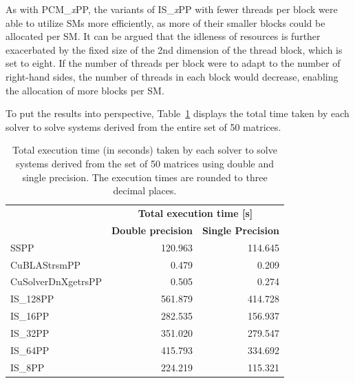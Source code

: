 As with PCM\_\textit{x}PP, the variants of IS\_\textit{x}PP with fewer threads per block were able to utilize SMs more efficiently, as more of their smaller blocks could be allocated per SM.
It can be argued that the idleness of resources is further exacerbated by the fixed size of the 2nd dimension of the thread block, which is set to eight.
If the number of threads per block were to adapt to the number of right-hand sides, the number of threads in each block would decrease, enabling the allocation of more blocks per SM.

To put the results into perspective, Table~\ref{Table:comparing-decomposers-and-solvers->decomposition-project-benchmarks->solvers-benchmark->comparison-of-execution-times-on-all-matrices->total-execution-time-of-solvers-on-set-of-50-matrices} displays the total time taken by each solver to solve systems derived from the entire set of 50 matrices.

\begin{table}[ht!]
	\centering
	\begin{tabular}{|l|r|r|}
		\hline
		\rowcolor[HTML]{C0C0C0} 
		\multicolumn{1}{|c|}{\cellcolor[HTML]{C0C0C0}}                                      & \multicolumn{2}{c|}{\cellcolor[HTML]{C0C0C0}\textbf{Total execution time {[}s{]}}}                                                                        \\ \cline{2-3} 
		\rowcolor[HTML]{EFEFEF} 
		\multicolumn{1}{|c|}{\multirow{-2}{*}{\cellcolor[HTML]{C0C0C0}\textbf{Solver}}} & \multicolumn{1}{l|}{\cellcolor[HTML]{EFEFEF}\textbf{Double precision}} & \multicolumn{1}{l|}{\cellcolor[HTML]{EFEFEF}\textbf{Single Precision}} \\ \hline
		\multicolumn{1}{|l|}{SSPP}               & 120.963 & 114.645 \\
		\multicolumn{1}{|l|}{CuBLAStrsmPP}       &   0.479 &   0.209 \\
		\multicolumn{1}{|l|}{CuSolverDnXgetrsPP} &   0.505 &   0.274 \\
		\multicolumn{1}{|l|}{IS\_128PP}          & 561.879 & 414.728 \\
		\multicolumn{1}{|l|}{IS\_16PP}           & 282.535 & 156.937 \\
		\multicolumn{1}{|l|}{IS\_32PP}           & 351.020 & 279.547 \\
		\multicolumn{1}{|l|}{IS\_64PP}           & 415.793 & 334.692 \\
		\multicolumn{1}{|l|}{IS\_8PP}            & 224.219 & 115.321 \\ \hline
	\end{tabular}
	\caption{Total execution time (in seconds) taken by each solver to solve systems derived from the set of 50 matrices using double and single precision.
		The execution times are rounded to three decimal places.
	}
	\label{Table:comparing-decomposers-and-solvers->decomposition-project-benchmarks->solvers-benchmark->comparison-of-execution-times-on-all-matrices->total-execution-time-of-solvers-on-set-of-50-matrices}
\end{table}

